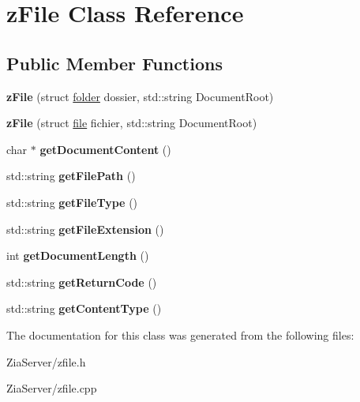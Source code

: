 \hypertarget{classz_file}{
\section{zFile Class Reference}
\label{classz_file}
}
\subsection*{Public Member Functions}
\begin{DoxyCompactItemize}
\item 
\hypertarget{classz_file_adca0fbce0ce8549f020a003dfad2010e}{
{\bfseries zFile} (struct \hyperlink{structfolder}{folder} dossier, std::string DocumentRoot)}
\label{classz_file_adca0fbce0ce8549f020a003dfad2010e}

\item 
\hypertarget{classz_file_a959c8cf75930a623e0e1d48d97988d4b}{
{\bfseries zFile} (struct \hyperlink{structfile}{file} fichier, std::string DocumentRoot)}
\label{classz_file_a959c8cf75930a623e0e1d48d97988d4b}

\item 
\hypertarget{classz_file_a1031b8a37ed3fe9a3d90e36d1a327c9e}{
char $\ast$ {\bfseries getDocumentContent} ()}
\label{classz_file_a1031b8a37ed3fe9a3d90e36d1a327c9e}

\item 
\hypertarget{classz_file_a04b04ed0d4aede3f1fb70eb56a9197f7}{
std::string {\bfseries getFilePath} ()}
\label{classz_file_a04b04ed0d4aede3f1fb70eb56a9197f7}

\item 
\hypertarget{classz_file_af29fb6da0efb830c9c78af95d0231401}{
std::string {\bfseries getFileType} ()}
\label{classz_file_af29fb6da0efb830c9c78af95d0231401}

\item 
\hypertarget{classz_file_a79185017be3a17e64719741a6b760eda}{
std::string {\bfseries getFileExtension} ()}
\label{classz_file_a79185017be3a17e64719741a6b760eda}

\item 
\hypertarget{classz_file_a24032fa6a82b917c677aa2daa9caf989}{
int {\bfseries getDocumentLength} ()}
\label{classz_file_a24032fa6a82b917c677aa2daa9caf989}

\item 
\hypertarget{classz_file_a9522751785e090ee69dd71a19a0ffcbf}{
std::string {\bfseries getReturnCode} ()}
\label{classz_file_a9522751785e090ee69dd71a19a0ffcbf}

\item 
\hypertarget{classz_file_aa16dc434c176c74a36b4605f94d1009f}{
std::string {\bfseries getContentType} ()}
\label{classz_file_aa16dc434c176c74a36b4605f94d1009f}

\end{DoxyCompactItemize}


The documentation for this class was generated from the following files:\begin{DoxyCompactItemize}
\item 
ZiaServer/zfile.h\item 
ZiaServer/zfile.cpp\end{DoxyCompactItemize}
